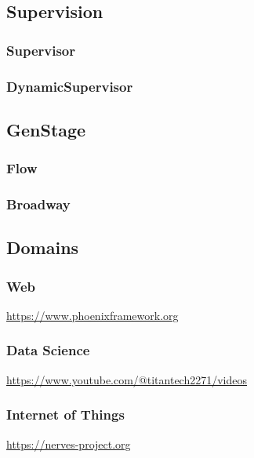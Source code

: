 \subsection{Supervision}
\subsubsection{Supervisor}
\subsubsection{DynamicSupervisor}

\subsection{GenStage}
\subsubsection{Flow}
\subsubsection{Broadway}

\subsection{Domains}

\subsubsection{Web}

\url{https://www.phoenixframework.org}

\subsubsection{Data Science}

\url{https://www.youtube.com/@titantech2271/videos}

\subsubsection{Internet of Things}

\url{https://nerves-project.org}

